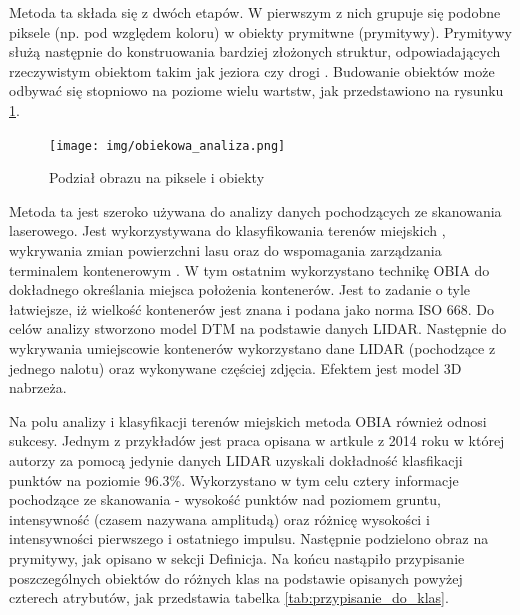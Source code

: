 Metoda ta składa się z dwóch etapów. W pierwszym z nich grupuje się podobne piksele (np. pod względem koloru) w obiekty prymitwne (prymitywy). Prymitywy służą następnie do konstruowania bardziej złożonych 
struktur, odpowiadających rzeczywistym obiektom takim jak jeziora czy drogi \cite{Blaschke2014}.  Budowanie obiektów może odbywać się stopniowo na poziome wielu wartstw, jak przedstawiono na rysunku
\ref{fig:poziomy_struktury}.

\begin{figure}[h!]
    \centering
    \texttt{[image: img/obiekowa\_analiza.png]}
    \caption{Podział obrazu na piksele i obiekty}
    \label{fig:poziomy_struktury}
\end{figure}

Metoda ta jest szeroko używana do analizy danych pochodzących ze skanowania laserowego. Jest wykorzystywana do klasyfikowania terenów miejskich \cite{zhou2013,chen2014},
wykrywania zmian powierzchni lasu \cite{zhang2014} oraz do wspomagania zarządzania terminalem kontenerowym \cite{tiede2015}. W tym ostatnim wykorzystano technikę OBIA do dokładnego określania miejsca położenia
kontenerów. Jest to zadanie o tyle łatwiejsze, iż wielkość kontenerów jest znana i podana jako norma ISO 668. Do celów analizy stworzono model DTM na podstawie danych LIDAR. Następnie do wykrywania
umiejscowie kontenerów wykorzystano dane LIDAR (pochodzące z jednego nalotu) oraz wykonywane częściej zdjęcia. Efektem jest model 3D nabrzeża.

Na polu analizy i klasyfikacji terenów miejskich metoda OBIA również odnosi sukcesy. Jednym z przykładów jest praca opisana w artkule z 2014 roku \cite{chen2014} w której autorzy za pomocą jedynie
danych LIDAR uzyskali dokładność klasfikacji punktów na poziomie  96.3\%. Wykorzystano w tym celu cztery informacje pochodzące ze skanowania - wysokość punktów nad poziomem gruntu, intensywność (czasem
nazywana amplitudą) oraz różnicę wysokości i intensywności pierwszego i ostatniego impulsu. Następnie podzielono obraz na prymitywy, jak opisano w sekcji Definicja. Na końcu nastąpiło przypisanie poszczególnych
obiektów do różnych klas na podstawie opisanych powyżej czterech atrybutów, jak przedstawia tabelka \ref{tab:przypisanie_do_klas}.

